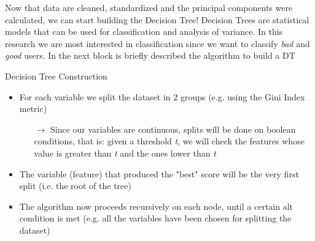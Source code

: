 	\begin{frame}
		Now that data are cleaned, standardized and the principal components were calculated, we can start building the Decision Tree!\newline\newline
		Decision Trees are statistical models that can be used for classification and analysis of variance.\newline\newline
		In this research we are most interested in classification since we want to classify \emph{bad} and \emph{good} users. In the next block is briefly described the algorithm to build a DT
		\begin{block}{Decision Tree Construction}
			\begin{itemize}
				\item For each variable we split the dataset in 2 groups (e.g. using the Gini Index metric)
				\begin{itemize}
					\item[$\rightarrow$] Since our variables are continuous, splits will be done on boolean conditions, that is: given a threshold \emph{t}, we will check the features whose value is greater than \emph{t} and the ones lower than \emph{t}
				\end{itemize}
				\item The variable (feature) that produced the "best" score will be the very first split (i.e. the root of the tree)
				\item The algorithm now proceeds recursively on each node, until a certain alt condition is met (e.g. all the variables have been chosen for splitting the dataset)
			\end{itemize}
		\end{block}
	\end{frame}
	
